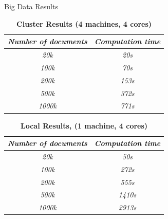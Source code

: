 \documentclass[final]{beamer}
\newlength{\onecolwid}
\begin{document}
\begin{frame}[t]
\begin{columns}[t]
\begin{column}{\onecolwid}
\begin{block}{Big Data Results}

\begin{table}[h]
\centering
\caption{{\bfseries Cluster Results (4 machines, 4 cores)}}
\label{my-label}
\begin{tabular}{@{}cc@{}}
\toprule
\textit{\textbf{Number of documents}} & \textit{\textbf{Computation time}} \\ \midrule
\textit{20k}                          & \textit{20s}                                 \\
\textit{100k}                         & \textit{70s}                                 \\
\textit{200k}                         & \textit{153s}                                \\
\textit{500k}                         & \textit{372s}                                \\
\textit{1000k}                         & \textit{771s}                                \\ \bottomrule
\end{tabular}
\end{table}

\begin{table}[h]
\centering
\caption{{\bfseries Local Results, (1 machine, 4 cores)}}
\label{my-label}
\begin{tabular}{@{}cc@{}}
\toprule
\textit{\textbf{Number of documents}} & \textit{\textbf{Computation time}} \\ \midrule
\textit{20k}                          & \textit{50s}                                 \\
\textit{100k}                          & \textit{272s}                                \\
\textit{200k}                          & \textit{555s}                                \\
\textit{500k}                          & \textit{1410s}                                \\
\textit{1000k}                          & \textit{2913s}                                \\ \bottomrule
\end{tabular}
\end{table}
\end{block}



\end{column} %

\end{columns} %

\end{frame} %
\end{document}
